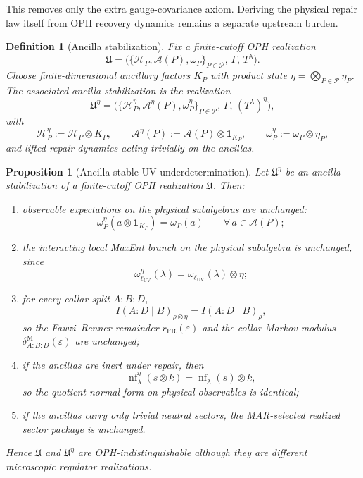 \documentclass[11pt]{article}
\newtheorem{proposition}[theorem]{Proposition}
\newtheorem{definition}[theorem]{Definition}
\newcommand{\nf}{\operatorname{nf}}
\begin{document}
This removes only the extra gauge-covariance axiom. Deriving the physical repair law itself from
OPH recovery dynamics remains a separate upstream burden.

\begin{definition}[Ancilla stabilization]\label{def:ancillastab}
Fix a finite-cutoff OPH realization
\[
\mathfrak U=
\bigl(\{\mathcal H_P,\mathcal A(P),\omega_P\}_{P\in\mathcal P},\,\Gamma,\,T^\lambda\bigr).
\]
Choose finite-dimensional ancillary factors \(K_P\) with product state \(\eta=\bigotimes_{P\in\mathcal P}\eta_P\). The associated ancilla stabilization is the realization
\[
\mathfrak U^\eta=
\bigl(\{\mathcal H_P^\eta,\mathcal A^\eta(P),\omega_P^\eta\}_{P\in\mathcal P},\,\Gamma,\,(T^\lambda)^\eta\bigr),
\]
with
\[
\mathcal H_P^\eta:=\mathcal H_P\otimes K_P,\qquad
\mathcal A^\eta(P):=\mathcal A(P)\otimes \mathbf 1_{K_P},\qquad
\omega_P^\eta:=\omega_P\otimes \eta_P,
\]
and lifted repair dynamics acting trivially on the ancillas.
\end{definition}

\begin{proposition}[Ancilla-stable UV underdetermination]\label{prop:ancillauv}
Let \(\mathfrak U^\eta\) be an ancilla stabilization of a finite-cutoff OPH realization \(\mathfrak U\). Then:
\begin{enumerate}[leftmargin=2em]
\item observable expectations on the physical subalgebras are unchanged:
\[
\omega_P^\eta(a\otimes \mathbf 1_{K_P})=\omega_P(a)
\qquad
\forall\, a\in\mathcal A(P);
\]
\item the interacting local MaxEnt branch on the physical subalgebra is unchanged, since
\[
\omega_{\ell_{\mathrm{UV}}}^\eta(\lambda)=\omega_{\ell_{\mathrm{UV}}}(\lambda)\otimes \eta;
\]
\item for every collar split \(A:B:D\),
\[
I(A:D\mid B)_{\rho\otimes \eta}=I(A:D\mid B)_\rho,
\]
so the Fawzi--Renner remainder \(r_{\mathrm{FR}}(\varepsilon)\) and the collar Markov modulus \(\delta^{\mathrm M}_{A:B:D}(\varepsilon)\) are unchanged;
\item if the ancillas are inert under repair, then
\[
\nf_\lambda^\eta(s\otimes k)=\nf_\lambda(s)\otimes k,
\]
so the quotient normal form on physical observables is identical;
\item if the ancillas carry only trivial neutral sectors, the MAR-selected realized sector package is unchanged.
\end{enumerate}
Hence \(\mathfrak U\) and \(\mathfrak U^\eta\) are OPH-indistinguishable although they are different microscopic regulator realizations.
\end{proposition}
\end{document}
